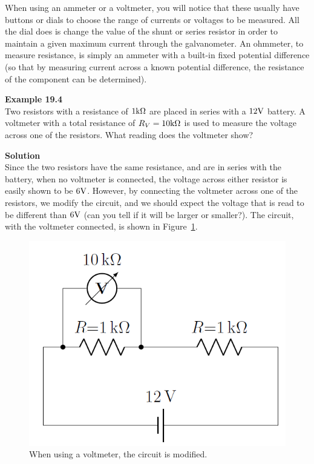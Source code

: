When using an ammeter or a voltmeter, you will notice that these usually have buttons or dials to choose the range of currents or voltages to be measured. All the dial does is change the value of the shunt or series resistor in order to maintain a given maximum current through the galvanometer. An ohmmeter, to measure resistance, is simply an ammeter with a built-in fixed potential difference (so that by measuring current across a known potential difference, the resistance of the component can be determined).

\begin{framed}
\textbf{Example 19.4}\\
Two resistors with a resistance of $1 {\rm k\Omega}$ are placed in series with a $12 {\rm V}$ battery. A voltmeter with a total resistance of $R_V=10 {\rm k\Omega}$ is used to measure the voltage across one of the resistors. What reading does the voltmeter show?

\begin{framed}
\textbf{Solution}\\
Since the two resistors have the same resistance, and are in series with the battery, when no voltmeter is connected, the voltage across either resistor is easily shown to be $6 {\rm V}$. However, by connecting the voltmeter across one of the resistors, we modify the circuit, and we should expect the voltage that is read to be different than $6 {\rm V}$ (can you tell if it will be larger or smaller?). The circuit, with the voltmeter connected, is shown in Figure~\ref{fig:circuits:voltmeter2R}.

\begin{figure}[!htbp]
\centering
\includegraphics[width=0.35\linewidth]{files/voltmeter2R-b7592cd3b8ef50a3b49d46c3cf69f11e.png}
\caption[]{When using a voltmeter, the circuit is modified.}
\label{fig:circuits:voltmeter2R}
\end{figure}


\end{framed}
\end{framed}
